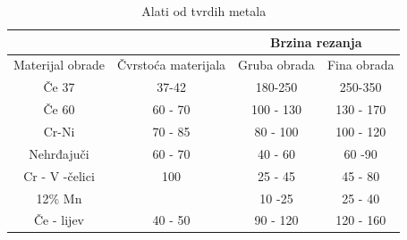 \documentclass[a4paper,12pt]{article}
\numberwithin{figure}{section}
\begin{document}
\begin{table}[!h]
\centering
\caption{Alati od tvrdih metala}
\label{my-label}
\begin{tabular}{cc|c|c|}
\cline{3-4}
\multicolumn{1}{l}{}                   & \multicolumn{1}{l|}{}                    & \multicolumn{2}{c|}{Brzina rezanja}                                  \\ \hline
\multicolumn{1}{|l|}{Materijal obrade} & \multicolumn{1}{l|}{Čvrstoća materijala} & \multicolumn{1}{l|}{Gruba obrada} & \multicolumn{1}{l|}{Fina obrada} \\ \hline
\multicolumn{1}{|c|}{Če 37}            & 37-42                                    & 180-250                           & 250-350                          \\ \hline
\multicolumn{1}{|c|}{Če 60}            & 60 - 70                                  & 100 - 130                         & 130 - 170                        \\ \hline
\multicolumn{1}{|c|}{Cr-Ni}            & 70 - 85                                  & 80 - 100                          & 100 - 120                        \\ \hline
\multicolumn{1}{|c|}{Nehrđajuči}       & 60 - 70                                  & 40 - 60                           & 60 -90                           \\ \hline
\multicolumn{1}{|c|}{Cr - V -čelici}   & 100                                      & 25 - 45                           & 45 - 80                          \\ \hline
\multicolumn{1}{|c|}{12\% Mn}            &                                          & 10 -25                            & 25 - 40                          \\ \hline
\multicolumn{1}{|c|}{Če - lijev}       & 40 - 50                                  & 90 - 120                          & 120 - 160                        \\ \hline
\end{tabular}
\end{table}
\FloatBarrier
\end{document}
